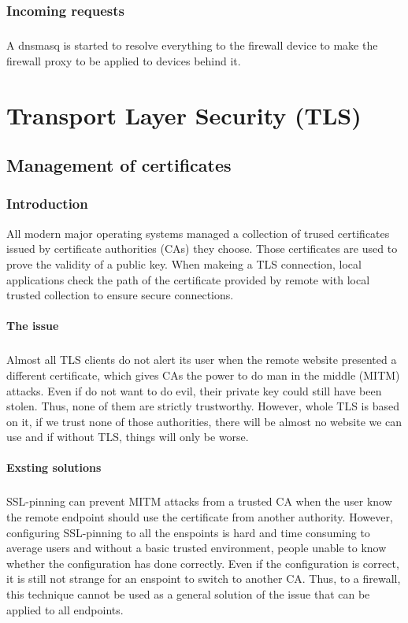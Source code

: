 \documentclass[mscthesis]{usiinfthesis}
\begin{document}
\subsection{Incoming requests}
\paragraph{}
A dnsmasq is started to resolve everything to the firewall device to make the firewall proxy to be applied to devices behind it.

\chapter{Transport Layer Security (TLS)}

\section{Management of certificates}

\subsection{Introduction}
All modern major operating systems managed a collection of trused certificates issued by certificate authorities (CAs) they choose. Those certificates are used to prove the validity of a public key. When makeing a TLS connection, local applications check the path of the certificate provided by remote with local trusted collection to ensure secure connections.
\subsubsection{The issue}
\paragraph{}
Almost all TLS clients do not alert its user when the remote website presented a different certificate, which gives CAs the power to do man in the middle (MITM) attacks. Even if  do not want to do evil, their private key could still have been stolen. Thus, none of them are strictly trustworthy. However, whole TLS is based on it, if we trust none of those authorities, there will be almost no website we can use and if without TLS, things will only be worse.
\subsubsection{Exsting solutions}
\paragraph{}
SSL-pinning can prevent MITM attacks from a trusted CA when the user know the remote endpoint should use the certificate from another authority. However, configuring SSL-pinning to all the enspoints is hard and time consuming to average users and without a basic trusted environment, people unable to know whether the configuration has done correctly. Even if the configuration is correct, it is still not strange for an enspoint to switch to another CA. Thus, to a firewall, this technique cannot be used as a general solution of the issue that can be applied to all endpoints.
\end{document}
